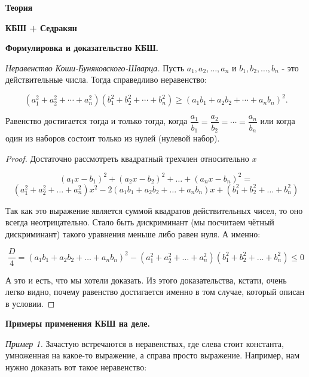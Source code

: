 \centerline{\bf \Huge Теория}
\centerline{\bf \Huge КБШ + Седракян}

\begin{flushright}
        \scriptsize{}
\end{flushright}

\centerline{\bf \large Формулировка и доказательство КБШ.}

\textit{Неравенство Коши-Буняковского-Шварца.}
Пусть $a_1, a_2, \ldots, a_n$ и $b_1, b_2, \ldots, b_n$ - это действительные числа. Тогда справедливо неравенство:

$$
\left(a_1^2+a_2^2+\cdots+a_n^2\right)\left(b_1^2+b_2^2+\cdots+b_n^2\right) \geqslant\left(a_1 b_1+a_2 b_2+\cdots+a_n b_n\right)^2 .
$$


Равенство достигается тогда и только тогда, когда $\dfrac{a_1}{b_1}=\dfrac{a_2}{b_2}=\cdots=\dfrac{a_n}{b_n}$ или когда один из наборов состоит только из нулей (нулевой набор).

\begin{proof}

    Достаточно рассмотреть квадратный трехчлен относительно $x$

    $$
    \left(a_1 x-b_1\right)^2+\left(a_2 x-b_2\right)^2+\ldots+\left(a_n x-b_n\right)^2 =
    $$
    $$
    \left(a_1^2 + a_2^2 + \ldots + a_n^2\right)x^2 - 2\left(a_1b_1 + a_2b_2 + \ldots + a_nb_n\right)x + (b_1^2 + b_2^2 + \ldots + b_n^2)
    $$

    Так как это выражение является суммой квадратов действительных чисел, то оно всегда неотрицательно. Стало быть дискриминант (мы посчитаем чётный дискриминант) такого уравнения меньше либо равен нуля. А именно:

    $$
    \dfrac{D}{4} = \left(a_1b_1 + a_2b_2 + \ldots + a_nb_n\right)^2 - \left(a_1^2 + a_2^2 + \ldots + a_n^2\right)(b_1^2 + b_2^2 + \ldots + b_n^2) \leqslant 0
    $$
    
    А это и есть, что мы хотели доказать. Из этого доказательства, кстати, очень легко видно, почему равенство достигается именно в том случае, который описан в условии.

\end{proof}

\newpage

\hspace{3mm}

\centerline{\bf \large Примеры применения КБШ на деле.}

\textit{Пример 1.} 
Зачастую встречаются в неравенствах, где слева стоит константа, умноженная на какое-то выражение, а справа просто выражение. Например, нам нужно доказать вот такое неравенство:

